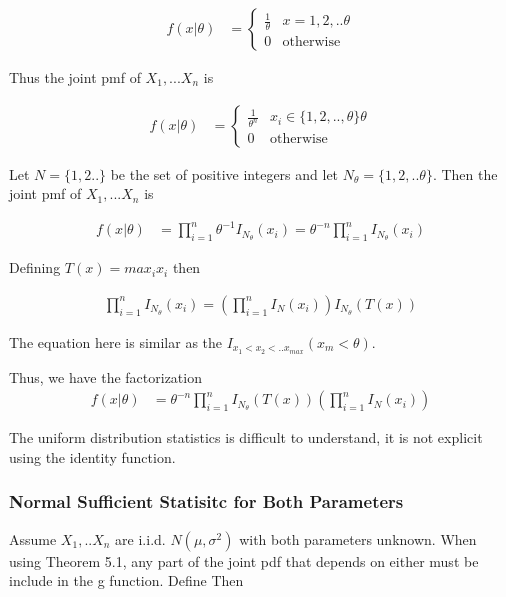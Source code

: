 \begin{align*}
	f(x|\theta) &= \begin{cases}
		\frac{1}{\theta} & x=1,2, .. \theta \\
		0 & \text{otherwise}
	\end{cases}
\end{align*}

Thus the joint pmf of $X_1, ...X_n$ is 

\begin{align*}
	f(x|\theta) &= \begin{cases}
		\frac{1}{\theta^n} & x_i \in \{1,2, .., \theta\} \theta \\
		0 & \text{otherwise}
	\end{cases}
\end{align*}

Let $N= \{1,2.. \}$ be the set of positive integers and let $N_{\theta} = \{1,2,.. \theta\}$. Then the joint pmf of $X_1, ... X_n$ is

\begin{align*}
	f(x|\theta) &= \prod_{i=1}^n \theta^{-1} I_{N_{\theta}} (x_i) = \theta^{-n} \prod_{i=1}^n I_{N_{\theta}} (x_i) 
\end{align*}

Defining $T(x) = max_i x_i$ then

\begin{align*}
	\prod_{i=1}^n I_{N_{\theta}} (x_i) = (\prod_{i=1}^n I_{N} (x_i)) I_{N_{\theta}} (T(x))
\end{align*}

The equation here is similar as the $I_{x_1 < x_2 <.. x_{max}} (x_m < \theta)$.

Thus, we have the factorization
\begin{align*}
	f(x|\theta) &= \theta^{-n} \prod_{i=1}^n I_{N_{\theta}} (T(x))  (\prod_{i=1}^n I_{N} (x_i))
\end{align*}

The uniform distribution statistics is difficult to understand, it is not explicit using the identity function. 

\subsubsection{Normal Sufficient Statisitc for Both Parameters}
Assume $X_1,..X_n$ are i.i.d. $N(\mu, \sigma^2)$ with both parameters unknown. When using Theorem 5.1, any part of the joint pdf that depends on either must be include in the g function. Define  Then


